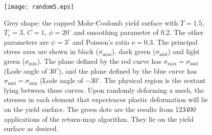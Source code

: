 \documentclass[]{scrreprt}
\newcommand{\smax}{\sigma_{\mathrm{max}}}
\newcommand{\smid}{\sigma_{\mathrm{mid}}}
\newcommand{\smin}{\sigma_{\mathrm{min}}}
\begin{document}
\begin{figure}[htb]
  \begin{center}
\texttt{[image: random5.eps]}
\caption{Grey shape: the capped Mohr-Coulomb yield surface with
  $T=1.5$, $T_{c}=3$, $C=1$, $\phi=20^{\circ}$ and smoothing parameter
  of 0.2.  The other parameters are $\psi=3^{\circ}$ and Poisson's
  ratio $\nu=0.3$.  The principal stress axes are shown in black ($\smax$),
  dark green ($\smid$) and light green ($\smin$).  The plane defined
  by the red curve has $\smax=\smid$ (Lode angle of $30^{\circ}$), and
  the plane defined by the blue curve has $\smid=\smin$ (Lode angle of
  $-30^{\circ}$.  The physical region is the sextant lying between
  these curves.  Upon randomly deforming a mesh, the stresses in each
  element that experiences plastic deformation will lie on the yield
  surface.  The green dots are the results from 123400 applications of
  the return-map algorithm.  They lie on the yield surface as
  desired.}
\label{random5.fig}
\end{center}
\end{figure}
\end{document}
